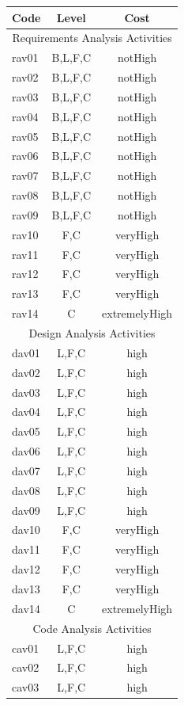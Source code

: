 \documentclass[twocolumn]{styles/IEEEtran}
\begin{document}
\begin{figure}[h]

 \begin{footnotesize} 
 \begin{center}
 \begin{tabular}[t]{|l|c|c|} \hline
Code 	& Level & Cost \\ \hline
 \multicolumn{3}{|c|}{Requirements Analysis Activities} \\ \hline
 rav01	&B,L,F,C	&notHigh \\
rav02	&B,L,F,C	&notHigh \\
rav03	&B,L,F,C	&notHigh \\
rav04	&B,L,F,C	&notHigh \\
rav05	&B,L,F,C	&notHigh \\
rav06	&B,L,F,C	&notHigh \\
rav07	&B,L,F,C	&notHigh \\
rav08	&B,L,F,C	&notHigh \\
rav09	&B,L,F,C	&notHigh \\
rav10	&F,C	&veryHigh \\
rav11	&F,C	&veryHigh \\
rav12	&F,C	&veryHigh \\
rav13	&F,C	&veryHigh \\
rav14	&C	&extremelyHigh \\ \hline
 \multicolumn{3}{|c|}{Design Analysis Activities} \\ \hline
dav01	&L,F,C	&high\\
dav02	&L,F,C	&high\\
dav03	&L,F,C	&high\\
dav04	&L,F,C	&high\\
dav05	&L,F,C	&high\\
dav06	&L,F,C	&high\\
dav07	&L,F,C	&high\\
dav08	&L,F,C	&high\\
dav09	&L,F,C	&high\\
dav10	&F,C	&veryHigh\\
dav11	&F,C	&veryHigh\\
dav12	&F,C	&veryHigh\\
dav13	&F,C	&veryHigh\\
dav14	&C	&extremelyHigh\\ \hline
 \multicolumn{3}{|c|}{Code Analysis Activities} \\ \hline
cav01	&L,F,C	&high\\
cav02	&L,F,C	&high\\
cav03	&L,F,C	&high\\

\end{tabular}
\end{center}
\end{footnotesize}
\end{figure}
\end{document}
